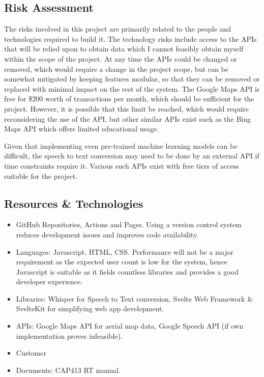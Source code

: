 \subsection{Risk Assessment}
The risks involved in this project are primarily related to the people and technologies required to build it.
The technology risks include access to the APIs that will be relied upon to obtain data which I cannot feasibly obtain myself within the scope of the project.
At any time the APIs could be changed or removed, which would require a change in the project scope, but can be somewhat mitigated by keeping features modular, so that they can be removed or replaced with minimal impact on the rest of the system.
The Google Maps API is free for \$200 worth of transactions per month, which should be sufficient for the project. However, it is possible that this limit be reached, which would require reconsidering the use of the API, but other similar APIs exist such as the Bing Maps API which offers limited educational usage.

Given that implementing even pre-trained machine learning models can be difficult, the speech to text conversion may need to be done by an external API if time constraints require it. Various such APIs exist with free tiers of access suitable for the project.

\subsection{Resources \& Technologies}
\begin{itemize}
    \item GitHub Repositories, Actions and Pages. Using a version control system reduces development issues and improves code availability.
    \item Languages: Javascript, HTML, CSS. Performance will not be a major requirement as the expected user count is low for the system, hence Javascript is suitable as it fields countless libraries and provides a good developer experience.
    \item Libraries: Whisper for Speech to Text conversion, Svelte Web Framework \& SvelteKit for simplifying web app development.
    \item APIs: Google Maps API for aerial map data, Google Speech API (if own implementation proves infeasible).
    \item Customer
    \item Documents: CAP413 RT manual.
\end{itemize}


